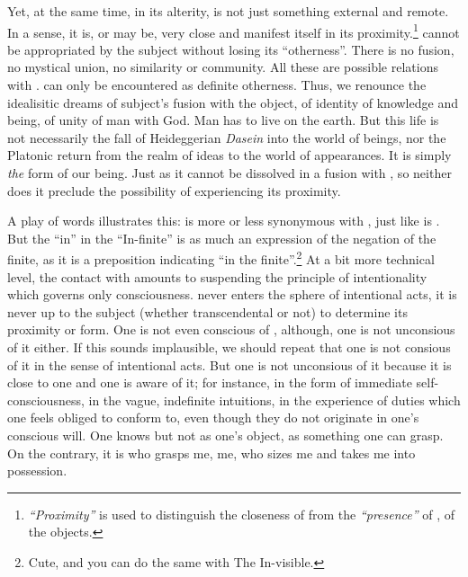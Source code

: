 Yet, at the same time,  in its alterity, is not just something external and remote.
In a sense, it is, or may be, very close and manifest itself in 
its proximity.\footnote{{\em ``Proximity''} is used to distinguish the 
closeness of  from the {\em ``presence''} of , of the objects.}
 cannot be appropriated by the subject without losing its ``otherness''. 
There is no fusion, no mystical
union, no similarity or community. All these are possible relations with . 
can only be encountered as definite otherness. Thus, we renounce the idealisitic dreams of
subject's fusion with the object, of identity of knowledge and being, of unity of man with
God. Man has to live on the earth. But this life is not necessarily the fall of Heideggerian
{\em Dasein} into the world of beings, nor the Platonic return from the realm of ideas
to the world of appearances. It is simply {\em the} form of our being. Just as it 
cannot be dissolved in a fusion with , so neither does it preclude  
the possibility of experiencing its proximity.

A play of words illustrates this:  is more or less synonymous with , 
just like  is . But the ``in'' in the ``In-finite'' is as much an
expression of the negation of the finite, as it is a preposition indicating 
``in the finite''.\footnote{Cute, and you can do the same with The In-visible.}
At a bit more technical level, the contact with  amounts to suspending the 
principle of intentionality
which governs only consciousness. {} never enters the sphere of intentional 
acts, it is never up to the subject (whether transcendental or not) 
to determine its proximity or form. One is not even
conscious of {}, although, one is not unconsious of it either. If this sounds
implausible, we should repeat that one is not consious of it in the sense of
intentional acts. But one is not unconsious of it because  it is close to one and one
is aware of it; for instance, in the form of immediate self-consciousness, in the
vague, indefinite intuitions, in the experience of duties which one feels obliged to 
conform to, even though they do not originate in one's conscious will. 
One knows  but not as one's object, as something one can grasp.
On the contrary, it is  who grasps me,  me, who 
sizes me and takes me into possession.

